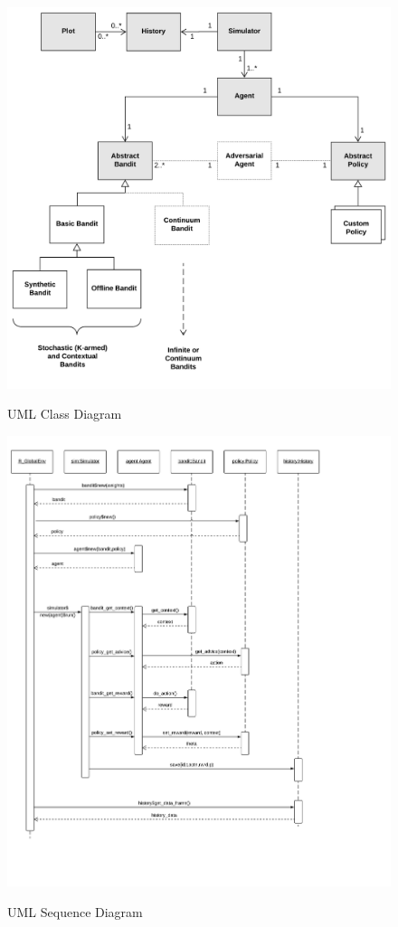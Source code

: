 \documentclass[nojss]{jss}\usepackage[]{graphicx}\usepackage[]{color}
\begin{document}
\begin{figure}[H]
  \centering
    \includegraphics[width=.99\textwidth]{fig/contextual_class}
    \label{fig:contextual_class}
      \caption{ UML Class Diagram}
\end{figure}

\begin{figure}[H]
  \centering
    \includegraphics[width=.99\textwidth]{fig/contextual_sequence}
    \label{fig:contextual_sequence}
      \caption{ UML Sequence Diagram}
\end{figure}
\end{document}
